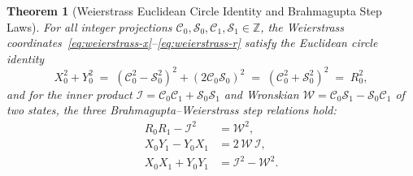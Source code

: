 \documentclass[11pt,a4paper]{article}
\theoremstyle{plain}
\newtheorem{theorem}{Theorem}[section]
\theoremstyle{definition}
\begin{document}
\begin{theorem}[Weierstrass Euclidean Circle Identity and Brahmagupta Step Laws]
\label{thm:main-1b}
For all integer projections $\mathcal{C}_0, \mathcal{S}_0, \mathcal{C}_1, \mathcal{S}_1 \in \mathbb{Z}$, the Weierstrass coordinates~\eqref{eq:weierstrass-x}--\eqref{eq:weierstrass-r} satisfy the Euclidean circle identity
\begin{equation}
  \label{eq:weierstrass-circle-id}
  X_0^2 + Y_0^2 \;=\; (\mathcal{C}_0^2 - \mathcal{S}_0^2)^2 + (2\mathcal{C}_0\mathcal{S}_0)^2 \;=\; (\mathcal{C}_0^2 + \mathcal{S}_0^2)^2 \;=\; R_0^2,
\end{equation}
and for the inner product $\mathcal{I} = \mathcal{C}_0\mathcal{C}_1 + \mathcal{S}_0\mathcal{S}_1$ and Wronskian $\mathcal{W} = \mathcal{C}_0\mathcal{S}_1 - \mathcal{S}_0\mathcal{C}_1$ of two states, the three Brahmagupta--Weierstrass step relations hold:
\begin{align}
  R_0 R_1 - \mathcal{I}^2 &= \mathcal{W}^2, \label{eq:brahmagupta-step-1} \\
  X_0 Y_1 - Y_0 X_1 &= 2\,\mathcal{W}\,\mathcal{I}, \label{eq:brahmagupta-step-2} \\
  X_0 X_1 + Y_0 Y_1 &= \mathcal{I}^2 - \mathcal{W}^2. \label{eq:brahmagupta-step-3}
\end{align}
\end{theorem}
\end{document}
